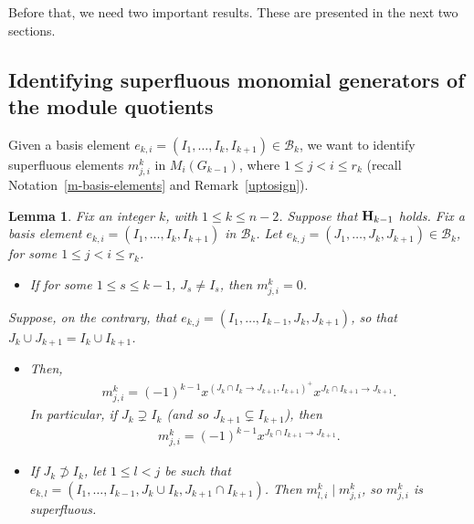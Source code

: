 \documentclass[10pt]{amsart}
\newcommand{\mcb}{\mbox{$\mathcal{B}$}}
\newcommand{\mbfh}{\mbox{${\bf H}$}}
\newtheorem{lemma}[cdrthm]{Lemma}
\theoremstyle{definition}
\theoremstyle{remark}
\begin{document}
Before that, we need two important results. These are presented in the next
two sections.

\subsection{Identifying superfluous monomial generators of the 
module quotients}

 Given a basis element $e_{k,i}=(I_1,\ldots
,I_k,I_{k+1})\in\mcb_k$, we want to identify superfluous elements
$m^k_{j,i}$ in $M_{i}(G_{k-1})$, where $1\leq j<i\leq r_k$ (recall
Notation~\ref{m-basis-elements} and Remark~\ref{uptosign}).

\begin{lemma}\label{superfluous}
Fix an integer $k$, with $1\leq k\leq n-2$. Suppose that $\mbfh_{k-1}$
holds. Fix a basis element $e_{k,i}=(I_1,\ldots ,I_k,I_{k+1})$ in
$\mcb_k$. Let $e_{k,j}=(J_1,\ldots ,J_k,J_{k+1})\in\mcb_k$, for some
$1\leq j<i\leq r_k$.
\begin{itemize}
\item[$(a)$] If for some $1\leq s\leq k-1$, $J_s\neq I_s$, then
  $m^k_{j,i}=0$. 
\end{itemize}
Suppose, on the contrary, that $e_{k,j}=(I_1,\ldots
,I_{k-1},J_{k},J_{k+1})$, so that $J_k\cup J_{k+1}=I_{k}\cup I_{k+1}$.
\begin{itemize}
\item[$(b)$] Then, 
\begin{eqnarray*}
m^k_{j,i} =(-1)^{k-1}x^{(J_k\cap I_k\to J_{k+1},I_{k+1})^+}x^{J_k\cap
  I_{k+1}\to J_{k+1}}.
\end{eqnarray*}
 In particular, if $J_k\supsetneq I_k$ (and so $J_{k+1}\subsetneq
 I_{k+1}$), then
\begin{eqnarray}\label{mji}
m^k_{j,i}=(-1)^{k-1}x^{J_{k}\cap I_{k+1}\to J_{k+1}}.
\end{eqnarray}
\item[$(c)$] If $J_k\not\supset I_k$, let $1\leq l<j$ be such that
  $e_{k,l}=(I_1,\ldots ,I_{k-1},J_{k}\cup I_k,J_{k+1}\cap
  I_{k+1})$. Then $m^k_{l,i}\mid m^k_{j,i}$, so $m^k_{j,i}$ is
  superfluous.
\end{itemize}
\end{lemma}
\end{document}
